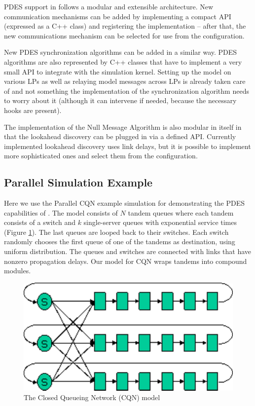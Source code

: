 PDES support in {\opp} follows a modular and extensible architecture.
New communication mechanisms can be added by implementing a compact
API (expressed as a C++ class) and registering the implementation --
after that, the new communications mechanism can be selected for use
from the configuration.

New PDES synchronization algorithms can be added in a similar way.
PDES algorithms are also represented by C++ classes that have
to implement a very small API
to integrate with the simulation kernel.
Setting up the model on various LPs as well as relaying
model messages across LPs is already taken care of and
not something the implementation of the synchronization algorithm
needs to worry about it (although it can intervene if needed,
because the necessary hooks are present).

The implementation of the Null Message Algorithm is also
modular in itself in that the lookahead discovery can be plugged
in via a defined API. Currently implemented lookahead
discovery uses link delays, but it is possible to
implement more sophisticated ones and select them from the
configuration.



\subsection{Parallel Simulation Example}

Here we use the Parallel CQN example simulation for demonstrating the
PDES capabilities of {\opp}.
The model consists of $N$ tandem queues where each tandem consists
of a switch and $k$ single-server queues with exponential service times
(Figure \ref{fig:cqn-model}).
The last queues are looped back to their switches. Each switch
randomly chooses the first queue of one of the tandems as destination,
using uniform distribution. The queues and switches are connected
with links that have nonzero propagation delays.
Our {\opp} model for CQN wraps tandems into compound modules.


\begin{figure}[htbp]
  \begin{center}
    \includegraphics{figures/cqn-model}
    \caption{The Closed Queueing Network (CQN) model}
    \label{fig:cqn-model}
  \end{center}
\end{figure}

